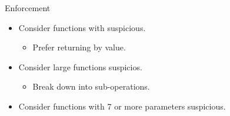 \begin{frame}[t]{Enforcement}
\begin{itemize}
  \item Consider functions with  suspicious.
    \begin{itemize}
      \item Prefer returning by value.
    \end{itemize}

  \item Consider large functions suspicios.
    \begin{itemize}
      \item Break down into sub-operations.
    \end{itemize}

  \item Consider functions with 7 or more parameters suspicious.
\end{itemize}
\end{frame}

